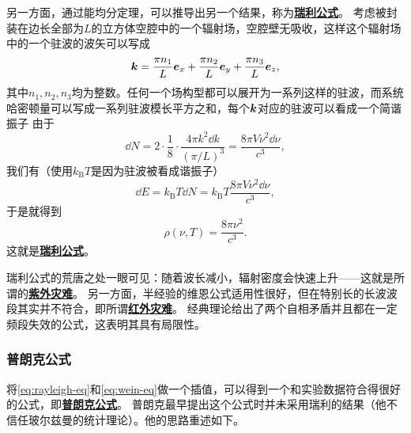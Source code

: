 \documentclass[UTF8, a4paper]{ctexart}
\newcommand{\concept}[1]{\underline{\textbf{#1}}}
\begin{document}
另一方面，通过能均分定理，可以推导出另一个结果，称为\concept{瑞利公式}。
考虑被封装在边长全部为$L$的立方体空腔中的一个辐射场，空腔壁无吸收，这样这个辐射场中的一个驻波的波矢可以写成
\begin{equation}
    \vb*{k} = \frac{\pi n_1}{L} \vb*{e}_x + \frac{\pi n_2}{L} \vb*{e}_y + \frac{\pi n_3}{L} \vb*{e}_z,
\end{equation}
其中$n_1, n_2, n_3$均为整数。任何一个场构型都可以展开为一系列这样的驻波，而系统哈密顿量可以写成一系列驻波模长平方之和，每个$\vb*{k}$对应的驻波可以看成一个简谐振子%
由于
\[
    \dd{N} = 2 \cdot \frac{1}{8} \cdot \frac{4\pi k^2 \dd{k}}{(\pi / L)^3} = \frac{8\pi V \nu^2 \dd{\nu}}{c^3},
\]
我们有（使用$k_\text{B} T$是因为驻波被看成谐振子）
\[
    \dd{E} = k_\text{B} T \dd{N} = k_\text{B} T \frac{8\pi V \nu^2 \dd{\nu}}{c^3},
\]
于是就得到
\begin{equation}
    \rho(\nu, T) = \frac{8\pi \nu^2}{c^3}.
    \label{eq:rayleigh-eq}
\end{equation}
这就是\concept{瑞利公式}。

瑞利公式的荒唐之处一眼可见：随着波长减小，辐射密度会快速上升——这就是所谓的\concept{紫外灾难}。
另一方面，半经验的维恩公式适用性很好，但在特别长的长波波段其实并不符合，即所谓\concept{红外灾难}。
经典理论给出了两个自相矛盾并且都在一定频段失效的公式，这表明其具有局限性。

\subsubsection{普朗克公式}

将\eqref{eq:rayleigh-eq}和\eqref{eq:wein-eq}做一个插值，可以得到一个和实验数据符合得很好的公式，即\concept{普朗克公式}。
普朗克最早提出这个公式时并未采用瑞利的结果（他不信任玻尔兹曼的统计理论）。他的思路重述如下。
\end{document}
